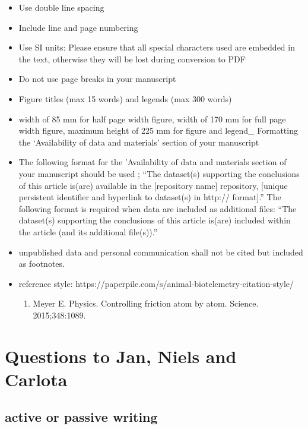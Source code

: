 \documentclass[
  authoryear,
  review,
  3p]{elsarticle}
\providecommand{\tightlist}{%
  \setlength{\itemsep}{0pt}\setlength{\parskip}{0pt}}\usepackage{longtable,booktabs,array}
\begin{document}
\begin{itemize}
\tightlist
\item
  Use double line spacing
\item
  Include line and page numbering
\item
  Use SI units: Please ensure that all special characters used are
  embedded in the text, otherwise they will be lost during conversion to
  PDF
\item
  Do not use page breaks in your manuscript
\item
  Figure titles (max 15 words) and legends (max 300 words)
\item
  width of 85 mm for half page width figure, width of 170 mm for full
  page width figure, maximum height of 225 mm for figure and legend\_
  Formatting the `Availability of data and materials' section of your
  manuscript
\item
  The following format for the 'Availability of data and materials
  section of your manuscript should be used ; ``The dataset(s)
  supporting the conclusions of this article is(are) available in the
  {[}repository name{]} repository, {[}unique persistent identifier and
  hyperlink to dataset(s) in http:// format{]}.'' The following format
  is required when data are included as additional files: ``The
  dataset(s) supporting the conclusions of this article is(are) included
  within the article (and its additional file(s)).''
\item
  unpublished data and personal communication shall not be cited but
  included as footnotes.
\item
  reference style:
  https://paperpile.com/s/animal-biotelemetry-citation-style/

  \begin{enumerate}
  \def\labelenumi{\arabic{enumi}.}
  \tightlist
  \item
    Meyer E. Physics. Controlling friction atom by atom. Science.
    2015;348:1089.
  \end{enumerate}
\end{itemize}

\hypertarget{sec-questions}{%
\section{Questions to Jan, Niels and Carlota}\label{sec-questions}}

\hypertarget{active-or-passive-writing}{%
\subsection{active or passive writing}\label{active-or-passive-writing}}
\end{document}
